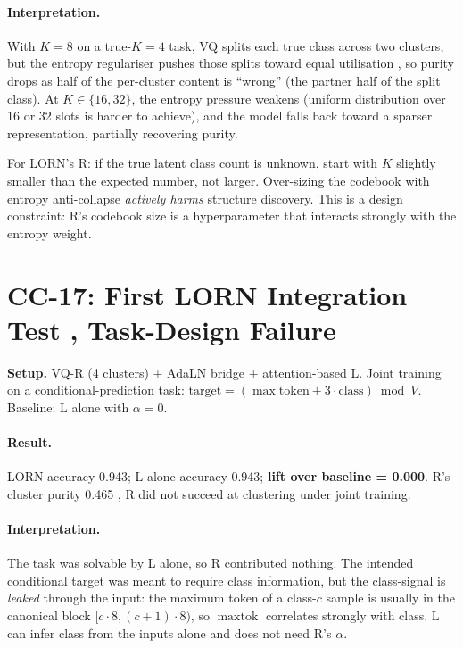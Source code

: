 \documentclass[10pt, twocolumn, a4paper]{article}
\begin{document}
\paragraph{Interpretation.} With $K=8$ on a true-$K=4$ task, VQ splits each true class across two clusters, but the entropy regulariser pushes those splits toward equal utilisation ,  so purity drops as half of the per-cluster content is ``wrong'' (the partner half of the split class). At $K \in \{16, 32\}$, the entropy pressure weakens (uniform distribution over 16 or 32 slots is harder to achieve), and the model falls back toward a sparser representation, partially recovering purity.

For LORN's R: if the true latent class count is unknown, start with $K$ slightly smaller than the expected number, not larger. Over-sizing the codebook with entropy anti-collapse \emph{actively harms} structure discovery. This is a design constraint: R's codebook size is a hyperparameter that interacts strongly with the entropy weight.

\section{CC-17: First LORN Integration Test ,  Task-Design Failure}

\textbf{Setup.} VQ-R (4 clusters) + AdaLN bridge + attention-based L. Joint training on a conditional-prediction task: $\mathrm{target} = (\max\mathrm{token} + 3 \cdot \mathrm{class}) \bmod V$. Baseline: L alone with $\alpha = 0$.

\paragraph{Result.} LORN accuracy 0.943; L-alone accuracy 0.943; \textbf{lift over baseline = 0.000}. R's cluster purity 0.465 ,  R did not succeed at clustering under joint training.

\paragraph{Interpretation.} The task was solvable by L alone, so R contributed nothing. The intended conditional target was meant to require class information, but the class-signal is \emph{leaked} through the input: the maximum token of a class-$c$ sample is usually in the canonical block $[c \cdot 8, (c+1) \cdot 8)$, so $\max\text{tok}$ correlates strongly with class. L can infer class from the inputs alone and does not need R's $\alpha$.
\end{document}
